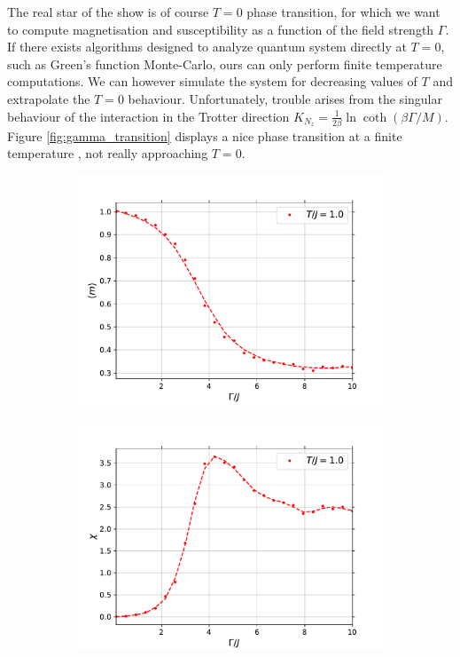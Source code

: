 \documentclass[11pt,openany]{article}
\begin{document}
The real star of the show is of course $T=0$ phase transition, for which we want to compute magnetisation and susceptibility as a function of the field strength $\Gamma$. If there exists algorithms designed to analyze quantum system directly at $T=0$, such as Green's function Monte-Carlo, ours can only perform finite temperature computations. We can however simulate the system for decreasing values of $T$ and extrapolate the $T=0$ behaviour. Unfortunately, trouble arises from the singular behaviour of the interaction in the Trotter direction $K_{N_z} = \frac{1}{2\beta}\ln\coth(\beta\Gamma/M)$. Figure \ref{fig:gamma_transition} displays a nice phase transition at a finite temperature , not really approaching $T=0$.

\begin{figure}[H]
	\centering
	\begin{subfigure}{0.45\textwidth}
		\centering
		\caption{}
		\label{fig:gamma_m}
		\includegraphics[width=\textwidth]{Plots/gamma_transition_m.pdf}
	\end{subfigure}
	\begin{subfigure}{0.45\textwidth}
		\centering
		\caption{}
		\label{fig:gamma_chi}
		\includegraphics[width=\textwidth]{Plots/gamma_transition_chi.pdf}

\end{subfigure}
\end{figure}
\end{document}
